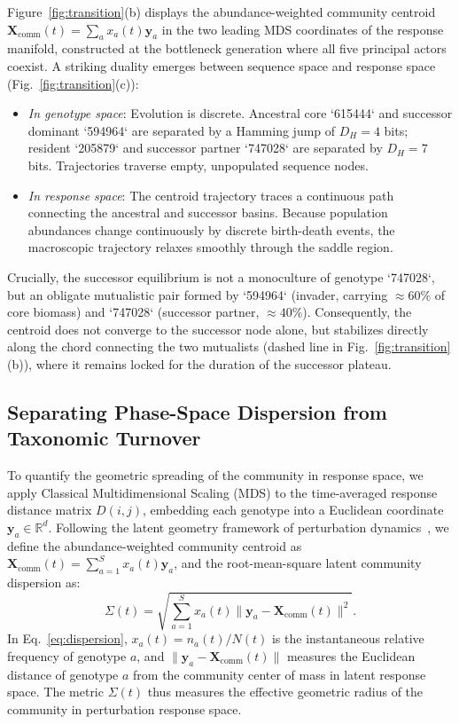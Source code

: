 \documentclass[twocolumn,amsmath,amssymb,aps,pra,10pt,floatfix,nofootinbib]{revtex4-2}
\begin{document}
Figure~\ref{fig:transition}(b) displays the abundance-weighted community centroid $\mathbf{X}_{\text{comm}}(t) = \sum_a x_a(t) \mathbf{y}_a$ in the two leading MDS coordinates of the response manifold, constructed at the bottleneck generation where all five principal actors coexist. A striking duality emerges between sequence space and response space (Fig.~\ref{fig:transition}(c)):
\begin{itemize}
    \item \textit{In genotype space}: Evolution is discrete. Ancestral core `615444` and successor dominant `594964` are separated by a Hamming jump of $D_H = 4$ bits; resident `205879` and successor partner `747028` are separated by $D_H = 7$ bits. Trajectories traverse empty, unpopulated sequence nodes.
    \item \textit{In response space}: The centroid trajectory traces a continuous path connecting the ancestral and successor basins. Because population abundances change continuously by discrete birth-death events, the macroscopic trajectory relaxes smoothly through the saddle region.
\end{itemize}
Crucially, the successor equilibrium is not a monoculture of genotype `747028`, but an obligate mutualistic pair formed by `594964` (invader, carrying $\approx 60\%$ of core biomass) and `747028` (successor partner, $\approx 40\%$). Consequently, the centroid does not converge to the successor node alone, but stabilizes directly along the chord connecting the two mutualists (dashed line in Fig.~\ref{fig:transition}(b)), where it remains locked for the duration of the successor plateau.

\subsection{Separating Phase-Space Dispersion from Taxonomic Turnover}

To quantify the geometric spreading of the community in response space, we apply Classical Multidimensional Scaling (MDS) to the time-averaged response distance matrix $D(i,j)$, embedding each genotype into a Euclidean coordinate $\mathbf{y}_a \in \mathbb{R}^d$. Following the latent geometry framework of perturbation dynamics~\cite{barzon2024unraveling}, we define the abundance-weighted community centroid as $\mathbf{X}_{\text{comm}}(t) = \sum_{a=1}^S x_a(t) \mathbf{y}_a$, and the root-mean-square latent community dispersion as:
\begin{equation}
\Sigma(t) = \sqrt{\sum_{a=1}^S x_a(t) \|\mathbf{y}_a - \mathbf{X}_{\text{comm}}(t)\|^2}.
\label{eq:dispersion}
\end{equation}
In Eq.~\eqref{eq:dispersion}, $x_a(t) = n_a(t) / N(t)$ is the instantaneous relative frequency of genotype $a$, and $\|\mathbf{y}_a - \mathbf{X}_{\text{comm}}(t)\|$ measures the Euclidean distance of genotype $a$ from the community center of mass in latent response space. The metric $\Sigma(t)$ thus measures the effective geometric radius of the community in perturbation response space.
\end{document}
